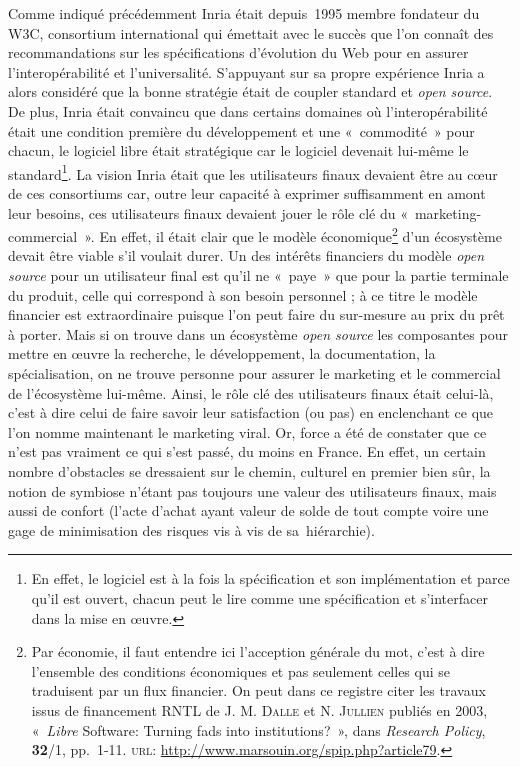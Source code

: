 \documentclass{FramateX}
\begin{document}
\begin{refsection}
Comme indiqué précédemment Inria était depuis~1995 membre fondateur du
W3C, consortium international qui émettait avec le succès que l'on
connaît des recommandations sur les spécifications d'évolution du Web
pour en assurer l'interopérabilité et l'universalité. S'appuyant sur sa
propre expérience Inria a alors considéré que la bonne stratégie était
de coupler standard et \textit{open source}. De plus, Inria était
convaincu que dans certains domaines où l'interopérabilité était une
condition première du développement et une «~commodité~» pour chacun,
le logiciel libre était stratégique car le logiciel devenait lui-même
le standard\footnote{En effet, le logiciel est
à la fois la spécification et son implémentation et parce qu'il est
ouvert, chacun peut le lire comme une spécification et s'interfacer
dans la mise en œuvre.}. La vision Inria était que les utilisateurs
finaux devaient être au cœur de ces consortiums car, outre leur
capacité à exprimer suffisamment en amont leur besoins, ces
utilisateurs finaux devaient jouer le rôle clé du
«~marketing-commercial~». En effet, il était clair que le modèle
économique\footnote{Par économie, il faut
entendre ici l'acception générale du mot, c'est à dire l'ensemble des conditions économiques et pas seulement celles qui se traduisent par un flux financier. On peut dans ce registre citer les travaux issus de
financement RNTL de J. M. \textsc{Dalle} et N. \textsc{Jullien} publiés en 2003, «~\textit{Libre} Software: Turning fads into institutions?~», dans \textit{Research Policy}, \textbf{32}/1, pp.~1-11. \textsc{url}: \url{http://www.marsouin.org/spip.php?article79}.} d'un écosystème devait être viable s'il voulait durer. Un des intérêts
financiers du modèle \textit{open source} pour un utilisateur final est
qu'il ne «~paye~» que pour la partie terminale du produit, celle qui
correspond à son besoin personnel ; à ce titre le modèle financier est
extraordinaire puisque l'on peut faire du sur-mesure au prix du prêt à
porter. Mais si on trouve dans un écosystème \textit{open source} les
composantes pour mettre en œuvre la recherche, le développement, la
documentation, la spécialisation, on ne trouve personne pour assurer le
marketing et le commercial de l'écosystème lui-même. Ainsi, le rôle clé
des utilisateurs finaux était celui-là, c'est à dire celui de faire
savoir leur satisfaction (ou pas) en enclenchant ce que l'on nomme
maintenant le marketing viral. Or, force a été de constater que ce
n'est pas vraiment ce qui s'est passé, du moins en France. En effet, un
certain nombre d'obstacles se dressaient sur le chemin, culturel en
premier bien sûr, la notion de symbiose n'étant pas toujours une valeur
des utilisateurs finaux, mais aussi de confort (l'acte d'achat ayant
valeur de solde de tout compte voire une gage de minimisation des
risques vis à vis de sa~hiérarchie). 



\end{refsection}
\end{document}
